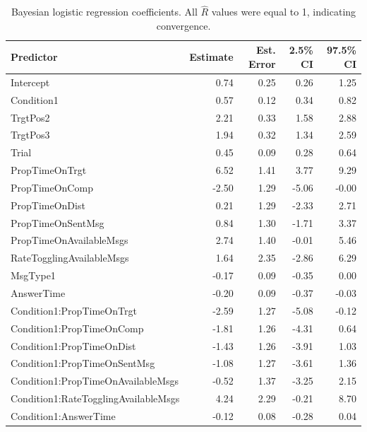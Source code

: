 \begin{table}[ht]

\centering
\caption{Bayesian logistic regression coefficients. All \(\hat{R}\) values were equal to 1, indicating convergence.}
\begin{tabular}{lrrrr}
\hline
\textbf{Predictor} & \textbf{Estimate} & \textbf{Est. Error} & \textbf{2.5\% CI} & \textbf{97.5\% CI} \\
\hline
Intercept                                & 0.74 & 0.25 & 0.26 & 1.25 \\
Condition1                               & 0.57 & 0.12 & 0.34 & 0.82 \\
TrgtPos2                                 & 2.21 & 0.33 & 1.58 & 2.88 \\
TrgtPos3                                 & 1.94 & 0.32 & 1.34 & 2.59 \\
Trial                                    & 0.45 & 0.09 & 0.28 & 0.64 \\
PropTimeOnTrgt                           & 6.52 & 1.41 & 3.77 & 9.29 \\
PropTimeOnComp                          & -2.50 & 1.29 & -5.06 & -0.00 \\
PropTimeOnDist                           & 0.21 & 1.29 & -2.33 & 2.71 \\
PropTimeOnSentMsg                        & 0.84 & 1.30 & -1.71 & 3.37 \\
PropTimeOnAvailableMsgs                  & 2.74 & 1.40 & -0.01 & 5.46 \\
RateTogglingAvailableMsgs                & 1.64 & 2.35 & -2.86 & 6.29 \\
MsgType1                                & -0.17 & 0.09 & -0.35 & 0.00 \\
AnswerTime                              & -0.20 & 0.09 & -0.37 & -0.03 \\
Condition1:PropTimeOnTrgt               & -2.59 & 1.27 & -5.08 & -0.12 \\
Condition1:PropTimeOnComp               & -1.81 & 1.26 & -4.31 & 0.64 \\
Condition1:PropTimeOnDist               & -1.43 & 1.26 & -3.91 & 1.03 \\
Condition1:PropTimeOnSentMsg            & -1.08 & 1.27 & -3.61 & 1.36 \\
Condition1:PropTimeOnAvailableMsgs      & -0.52 & 1.37 & -3.25 & 2.15 \\
Condition1:RateTogglingAvailableMsgs     & 4.24 & 2.29 & -0.21 & 8.70 \\
Condition1:AnswerTime                   & -0.12 & 0.08 & -0.28 & 0.04 \\
\hline
\end{tabular}
\label{tab:bayesian_model_coefficients_acc}
\end{table}

